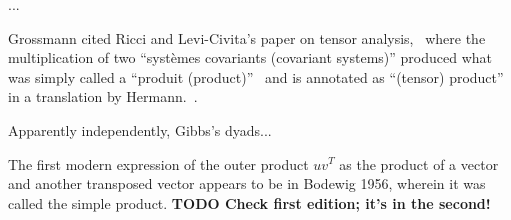 ...

Grossmann cited Ricci and Levi-Civita's paper on tensor analysis,~\cite{Ricci1900} where the multiplication of two ``systèmes covariants (covariant systems)'' produced what was simply called a ``produit (product)''~\cite[p. 133]{Ricci1900} and is annotated as ``(tensor) product'' in a translation by Hermann.~\cite[p. 28]{Hermann1975}.

Apparently independently, Gibbs's dyads...


The first modern expression of the outer product $u v^T$ as the product of a vector and another transposed vector appears to be in Bodewig 1956\cite{Bodewig1956}, wherein it was called the simple product. \textbf{TODO Check first edition; it's in the second!}

